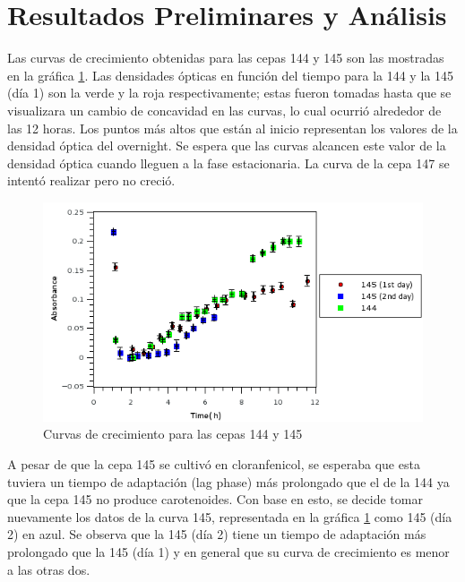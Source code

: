 \documentclass[%
 reprint,
 amsmath,amssymb,
 aps,
]{revtex4-2}
\begin{document}
\section{Resultados Preliminares y An\'alisis}
Las curvas de crecimiento obtenidas para las cepas 144 y 145 son las mostradas en la gr\'{a}fica \ref{fig:cur1}. Las densidades \'{o}pticas en funci\'{o}n del tiempo para la 144 y la 145 (d\'{i}a 1) son la verde y la roja respectivamente; estas fueron tomadas hasta que se visualizara un cambio de concavidad en las curvas, lo cual ocurri\'{o} alrededor de las 12 horas. Los puntos m\'{a}s altos que est\'{a}n al inicio representan los valores de la densidad \'{o}ptica del overnight. Se espera que las curvas alcancen este valor de la densidad \'{o}ptica cuando lleguen a la fase estacionaria. La curva de la cepa 147 se intent\'{o} realizar pero no creci\'{o}.\\
\begin{figure}[h]
 \includegraphics[width=\linewidth]{curvas/gratodas.png}
  \caption{Curvas de crecimiento para las cepas 144 y 145}
  \label{fig:cur1}
\end{figure}
 A pesar de que la cepa 145 se cultiv\'{o} en cloranfenicol, se esperaba que esta tuviera un tiempo de adaptaci\'{o}n (lag phase) m\'{a}s prolongado que el de la 144 ya que la cepa 145 no produce carotenoides. Con base en esto, se decide tomar nuevamente los datos de la curva 145, representada en la gr\'{a}fica  \ref{fig:cur1} como 145 (d\'{i}a 2) en azul. Se observa que la 145 (d\'{i}a 2) tiene un tiempo de adaptaci\'{o}n m\'{a}s prolongado que la 145 (d\'{i}a 1) y en general que su curva de crecimiento es menor a las otras dos.\\
 
\end{document}
